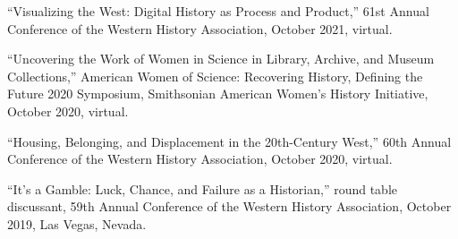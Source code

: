 ``Visualizing the West: Digital History as Process and Product,'' 61st
Annual Conference of the Western History Association, October 2021,
virtual.

``Uncovering the Work of Women in Science in Library, Archive, and
Museum Collections,'' American Women of Science: Recovering History,
Defining the Future 2020 Symposium, Smithsonian American Women's History
Initiative, October 2020, virtual.

``Housing, Belonging, and Displacement in the 20th-Century West,'' 60th
Annual Conference of the Western History Association, October 2020,
virtual.

``It's a Gamble: Luck, Chance, and Failure as a Historian,'' round table
discussant, 59th Annual Conference of the Western History Association,
October 2019, Las Vegas, Nevada.
